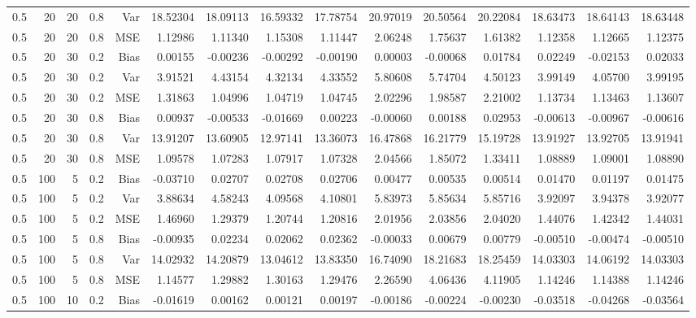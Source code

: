\begin{table}[!htbp]
\begin{tabular}{lrrrrrrrrrrrrrr}
0.5 &  20 & 20 & 0.8 & Var & 18.52304 & 18.09113 & 16.59332 & 17.78754 & 20.97019 & 20.50564 & 20.22084 & 18.63473 & 18.64143 & 18.63448 \\
0.5 &  20 & 20 & 0.8 & MSE & 1.12986 & 1.11340 & 1.15308 & 1.11447 & 2.06248 & 1.75637 & 1.61382 & 1.12358 & 1.12665 & 1.12375 \\
0.5 &  20 & 30 & 0.2 & Bias & 0.00155 & -0.00236 & -0.00292 & -0.00190 & 0.00003 & -0.00068 & 0.01784 & 0.02249 & -0.02153 & 0.02033 \\
0.5 &  20 & 30 & 0.2 & Var & 3.91521 & 4.43154 & 4.32134 & 4.33552 & 5.80608 & 5.74704 & 4.50123 & 3.99149 & 4.05700 & 3.99195 \\
0.5 &  20 & 30 & 0.2 & MSE & 1.31863 & 1.04996 & 1.04719 & 1.04745 & 2.02296 & 1.98587 & 2.21002 & 1.13734 & 1.13463 & 1.13607 \\
0.5 &  20 & 30 & 0.8 & Bias & 0.00937 & -0.00533 & -0.01669 & 0.00223 & -0.00060 & 0.00188 & 0.02953 & -0.00613 & -0.00967 & -0.00616 \\
0.5 &  20 & 30 & 0.8 & Var & 13.91207 & 13.60905 & 12.97141 & 13.36073 & 16.47868 & 16.21779 & 15.19728 & 13.91927 & 13.92705 & 13.91941 \\
0.5 &  20 & 30 & 0.8 & MSE & 1.09578 & 1.07283 & 1.07917 & 1.07328 & 2.04566 & 1.85072 & 1.33411 & 1.08889 & 1.09001 & 1.08890 \\
0.5 & 100 &  5 & 0.2 & Bias & -0.03710 & 0.02707 & 0.02708 & 0.02706 & 0.00477 & 0.00535 & 0.00514 & 0.01470 & 0.01197 & 0.01475 \\
0.5 & 100 &  5 & 0.2 & Var & 3.88634 & 4.58243 & 4.09568 & 4.10801 & 5.83973 & 5.85634 & 5.85716 & 3.92097 & 3.94378 & 3.92077 \\
0.5 & 100 &  5 & 0.2 & MSE & 1.46960 & 1.29379 & 1.20744 & 1.20816 & 2.01956 & 2.03856 & 2.04020 & 1.44076 & 1.42342 & 1.44031 \\
0.5 & 100 &  5 & 0.8 & Bias & -0.00935 & 0.02234 & 0.02062 & 0.02362 & -0.00033 & 0.00679 & 0.00779 & -0.00510 & -0.00474 & -0.00510 \\
0.5 & 100 &  5 & 0.8 & Var & 14.02932 & 14.20879 & 13.04612 & 13.83350 & 16.74090 & 18.21683 & 18.25459 & 14.03303 & 14.06192 & 14.03303 \\
0.5 & 100 &  5 & 0.8 & MSE & 1.14577 & 1.29882 & 1.30163 & 1.29476 & 2.26590 & 4.06436 & 4.11905 & 1.14246 & 1.14388 & 1.14246 \\
0.5 & 100 & 10 & 0.2 & Bias & -0.01619 & 0.00162 & 0.00121 & 0.00197 & -0.00186 & -0.00224 & -0.00230 & -0.03518 & -0.04268 & -0.03564 \\

\end{tabular}
\end{table}
